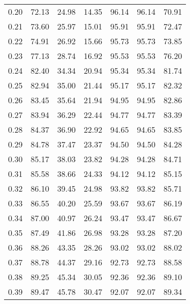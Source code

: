 \begin{tabular}{|c|c|c|c|c|c|c|}
      0.20 &     72.13 &     24.98 &      14.35 &   96.14 &      96.14 &         70.91 \\
      0.21 &     73.60 &     25.97 &      15.01 &   95.91 &      95.91 &         72.47 \\
      0.22 &     74.91 &     26.92 &      15.66 &   95.73 &      95.73 &         73.85 \\
      0.23 &     77.13 &     28.74 &      16.92 &   95.53 &      95.53 &         76.20 \\
      0.24 &     82.40 &     34.34 &      20.94 &   95.34 &      95.34 &         81.74 \\
      0.25 &     82.94 &     35.00 &      21.44 &   95.17 &      95.17 &         82.32 \\
      0.26 &     83.45 &     35.64 &      21.94 &   94.95 &      94.95 &         82.86 \\
      0.27 &     83.94 &     36.29 &      22.44 &   94.77 &      94.77 &         83.39 \\
      0.28 &     84.37 &     36.90 &      22.92 &   94.65 &      94.65 &         83.85 \\
      0.29 &     84.78 &     37.47 &      23.37 &   94.50 &      94.50 &         84.28 \\
      0.30 &     85.17 &     38.03 &      23.82 &   94.28 &      94.28 &         84.71 \\
      0.31 &     85.58 &     38.66 &      24.33 &   94.12 &      94.12 &         85.15 \\
      0.32 &     86.10 &     39.45 &      24.98 &   93.82 &      93.82 &         85.71 \\
      0.33 &     86.55 &     40.20 &      25.59 &   93.67 &      93.67 &         86.19 \\
      0.34 &     87.00 &     40.97 &      26.24 &   93.47 &      93.47 &         86.67 \\
      0.35 &     87.49 &     41.86 &      26.98 &   93.28 &      93.28 &         87.20 \\
      0.36 &     88.26 &     43.35 &      28.26 &   93.02 &      93.02 &         88.02 \\
      0.37 &     88.78 &     44.37 &      29.16 &   92.73 &      92.73 &         88.58 \\
      0.38 &     89.25 &     45.34 &      30.05 &   92.36 &      92.36 &         89.10 \\
      0.39 &     89.47 &     45.78 &      30.47 &   92.07 &      92.07 &         89.34 \\

\end{tabular}
